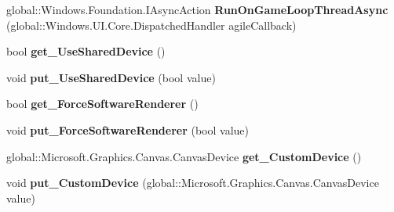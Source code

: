 \begin{DoxyCompactItemize}
global\+::\+Windows.\+Foundation.\+I\+Async\+Action {\bfseries Run\+On\+Game\+Loop\+Thread\+Async} (global\+::\+Windows.\+U\+I.\+Core.\+Dispatched\+Handler agile\+Callback)
\item 
\mbox{\label{class_microsoft_1_1_graphics_1_1_canvas_1_1_u_i_1_1_xaml_1_1_canvas_animated_control_a4ecc9ba2b48c0c82c98292d4c56ce566}} 
bool {\bfseries get\+\_\+\+Use\+Shared\+Device} ()
\item 
\mbox{\label{class_microsoft_1_1_graphics_1_1_canvas_1_1_u_i_1_1_xaml_1_1_canvas_animated_control_a4cf16f645c5c041b2789957edfabba6f}} 
void {\bfseries put\+\_\+\+Use\+Shared\+Device} (bool value)
\item 
\mbox{\label{class_microsoft_1_1_graphics_1_1_canvas_1_1_u_i_1_1_xaml_1_1_canvas_animated_control_a7832872f65d5600713fbe9a68d782b54}} 
bool {\bfseries get\+\_\+\+Force\+Software\+Renderer} ()
\item 
\mbox{\label{class_microsoft_1_1_graphics_1_1_canvas_1_1_u_i_1_1_xaml_1_1_canvas_animated_control_ae2443c631de1a00c1e44d680363acd45}} 
void {\bfseries put\+\_\+\+Force\+Software\+Renderer} (bool value)
\item 
\mbox{\label{class_microsoft_1_1_graphics_1_1_canvas_1_1_u_i_1_1_xaml_1_1_canvas_animated_control_a17fb6529b7f97cb7eec28db12e4e438b}} 
global\+::\+Microsoft.\+Graphics.\+Canvas.\+Canvas\+Device {\bfseries get\+\_\+\+Custom\+Device} ()
\item 
\mbox{\label{class_microsoft_1_1_graphics_1_1_canvas_1_1_u_i_1_1_xaml_1_1_canvas_animated_control_a78fcff8bd800e4cefb4b1a3e7fdf0bbb}} 
void {\bfseries put\+\_\+\+Custom\+Device} (global\+::\+Microsoft.\+Graphics.\+Canvas.\+Canvas\+Device value)
\item 
\mbox{\label{class_microsoft_1_1_graphics_1_1_canvas_1_1_u_i_1_1_xaml_1_1_canvas_animated_control_a0f7a2890504c7e9d2ed733f76f001880}} 

\end{DoxyCompactItemize}
